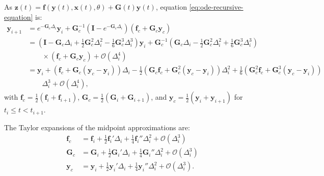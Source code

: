 As $\mathbf{z}(t) = \mathbf{f}(\mathbf{y}(t), \mathbf{x}(t), \theta) + \mathbf{G}(t)\mathbf{y}(t)$, equation \ref{eq:ode-recursive-equation} is:
\begin{equation}
\begin{split}
    \mathbf{y}_{i+1} & = e^{-\mathbf{G}_c\Delta_i}\mathbf{y}_i+\mathbf{G}_c^{-1}\left(\mathbf{I}-e^{-\mathbf{G}_c\Delta_i}\right)\left(\mathbf{f}_c+\mathbf{G}_c\mathbf{y}_c\right) \\
    & = \left(\mathbf{I}-\mathbf{G}_c\Delta_i+\frac{1}{2}\mathbf{G}_c^2\Delta_i^2-\frac{1}{6}\mathbf{G}_c^3\Delta_i^3\right)\mathbf{y}_i + \mathbf{G}_c^{-1}\left(\mathbf{G}_c\Delta_i-\frac{1}{2}\mathbf{G}_c^2\Delta_i^2+\frac{1}{6}\mathbf{G}_c^3\Delta_i^3\right) \\
    & \qquad \times \left(\mathbf{f}_c +\mathbf{G}_c\mathbf{y}_c\right) + \mathcal{O}(\Delta_i^4) \\
    & = \mathbf{y}_i+\left(\mathbf{f}_c+\mathbf{G}_c\left(\mathbf{y}_c-\mathbf{y}_i\right)\right)\Delta_i-\frac{1}{2}\left(\mathbf{G}_c\mathbf{f}_c+\mathbf{G}_c^2\left(\mathbf{y}_c-\mathbf{y}_i\right)\right)\Delta_i^2+\frac{1}{6}\left(\mathbf{G}_c^2\mathbf{f}_c+\mathbf{G}_c^3\left(\mathbf{y}_c-\mathbf{y}_i\right)\right) \\
    & \qquad \Delta_i^3+\mathcal{O}(\Delta_i^4),
\end{split}
\end{equation}
with $\mathbf{f}_c = \frac{1}{2}\left(\mathbf{f}_i+\mathbf{f}_{i+1}\right)$, $\mathbf{G}_c = \frac{1}{2}\left(\mathbf{G}_i+\mathbf{G}_{i+1}\right)$, and $\mathbf{y}_c = \frac{1}{2}\left(\mathbf{y}_i+\mathbf{y}_{i+1}\right)$ for $t_i \le t < t_{i+1}$. 

The Taylor expansions of the midpoint approximations are:
\begin{equation}
\begin{split}
    \mathbf{f}_c & = \mathbf{f}_i + \frac{1}{2}\mathbf{f}_i'\Delta_i + \frac{1}{4} \mathbf{f}_i''\Delta_i^2 + \mathcal{O}(\Delta_i^3) \\
    \mathbf{G}_c & = \mathbf{G}_i + \frac{1}{2}\mathbf{G}_i'\Delta_i + \frac{1}{4} \mathbf{G}_i'' \Delta_i^2 + \mathcal{O}(\Delta_i^3) \\
    \mathbf{y}_c & = \mathbf{y}_i + \frac{1}{2}\mathbf{y}_i'\Delta_i + \frac{1}{4} \mathbf{y}_i'' \Delta_i^2 + \mathcal{O}(\Delta_i^3).
\end{split}
\end{equation}

